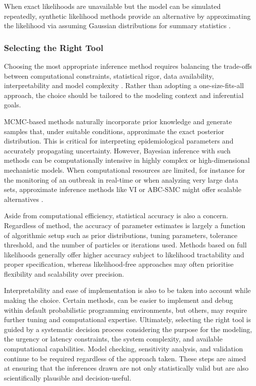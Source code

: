 \documentclass{article}
\begin{document}
When exact likelihoods are unavailable but the model can be simulated repeatedly, synthetic likelihood methods provide an alternative by approximating the likelihood via assuming Gaussian distributions for summary statistics \citep{wood2010statistical, price2018bayesian}. 

\subsubsection{Selecting the Right Tool}

Choosing the most appropriate inference method requires balancing the trade-offs between computational constraints, statistical rigor, data availability, interpretability and model complexity  \citep{funk2020choices}. Rather than adopting a one-size-fits-all approach, the choice should be tailored to the modeling context and inferential goals. 

MCMC-based methods naturally incorporate prior knowledge and generate samples that, under suitable conditions, approximate the exact posterior distribution. This is critical for interpreting epidemiological parameters and accurately propagating uncertainty. However, Bayesian inference with such methods can be computationally intensive in highly complex or high-dimensional mechanistic models. When computational resources are limited, for instance for the monitoring of an outbreak in real-time or when analyzing very large data sets, approximate inference methods like VI or ABC-SMC might offer scalable alternatives \citep{chatzilena2019contemporary, engebretsen2023real}.

Aside from computational efficiency, statistical accuracy is also a concern. Regardless of method, the accuracy of parameter estimates is largely a function of algorithmic setup such as prior distributions, tuning parameters, tolerance threshold, and the number of particles or iterations used. Methods based on full likelihoods generally offer higher accuracy subject to likelihood tractability and proper specification, whereas likelihood-free approaches may often prioritise flexibility and scalability over precision. 

Interpretability and ease of implementation is also to be taken into account while making the choice. Certain methods,  can be easier to implement and debug within default probabilistic programming environments, but others, may require further tuning and computational expertise. Ultimately, selecting the right tool is guided by a systematic decision process considering the purpose for the modeling, the urgency or latency constraints, the system complexity, and available computational capabilities. Model checking, sensitivity analysis, and validation continue to be required regardless of the approach taken. These steps are aimed at ensuring that the inferences drawn are not only statistically valid but are also scientifically plausible and decision-useful.
\end{document}
